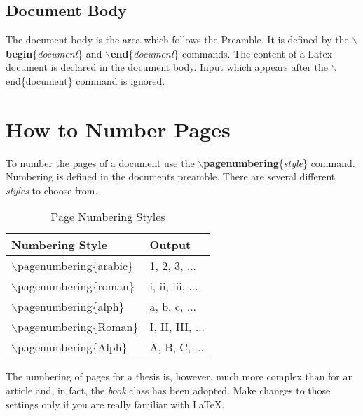 \subsection{Document Body}
The document body is the area which follows the Preamble. It is defined by the \textbf{$\backslash$begin}\{\textit{document}\} and \textbf{$\backslash$end}\{\textit{document}\} commands.  The content of a Latex document is declared in the document body.  Input which appears after the $\backslash$end\{document\} command is ignored.

\section{How to Number Pages}
To number the pages of a document use the \textbf{$\backslash$pagenumbering}\{\textit{style}\} command. Numbering is defined in the documents preamble. There are several different \textit{styles} to choose from.%
\begin{table}[h]
    \begin{center}
        \begin{tabular}{|l|l|}
            \hline 
            \textrm{\textbf{Numbering Style}}   & \textrm{\textbf{Output}} \\ \hline
            $\backslash$pagenumbering\{arabic\} & 1, 2, 3, ...\\ \hline
            $\backslash$pagenumbering\{roman\}  & i, ii, iii, ...\\ \hline
            $\backslash$pagenumbering\{alph\}   & a, b, c, ...\\ \hline
            $\backslash$pagenumbering\{Roman\}  & I, II, III, ...\\ \hline
            $\backslash$pagenumbering\{Alph\}   & A, B, C, ... \\ \hline
        \end{tabular}
        \caption{Page Numbering Styles}
        \label{tb:Xname}
    \end{center}
\end{table}

 The numbering of pages for a thesis is, however, much more complex than for an article and, in fact, the \textit{book} class has been adopted. Make changes to those settings only if you are really familiar with \LaTeX.

